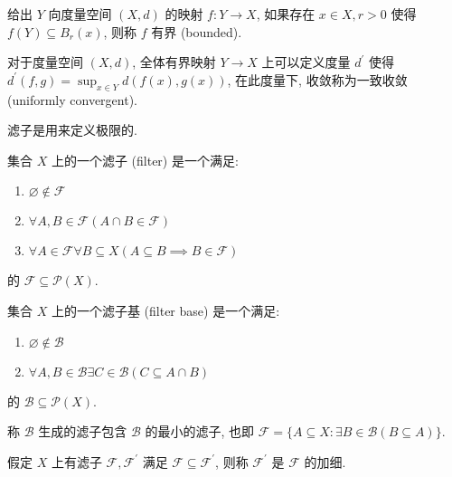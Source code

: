\begin{definition}[有界]
    给出 \(Y\) 向度量空间 \((X,d)\) 的映射 \(f : Y \to X\), 如果存在 \(x \in X,r > 0\) 使得 \(f(Y) \subseteq B_r (x)\), 则称 \(f\) 有界 (bounded).
\end{definition}

\begin{definition}
    对于度量空间 \((X,d)\), 全体有界映射 \(Y \to X\) 上可以定义度量 \(d^\prime\) 使得 \(d^\prime (f,g) = \sup_{x \in Y} d(f(x),g(x))\),
    在此度量下, 收敛称为一致收敛 (uniformly convergent).
\end{definition}

滤子是用来定义极限的.

\begin{definition}[滤子]
    集合 \(X\) 上的一个滤子 (filter) 是一个满足:

    \begin{enumerate}
        \item \(\varnothing \notin \mathcal{F}\)
        \item \(\forall A,B \in \mathcal{F} (A \cap B \in \mathcal{F})\)
        \item \(\forall A \in \mathcal{F} \forall B \subseteq X (A \subseteq B \implies B \in \mathcal{F})\)
    \end{enumerate}

    的 \(\mathcal{F} \subseteq \mathcal{P} (X)\).
\end{definition}

\begin{definition}[滤子基]
    集合 \(X\) 上的一个滤子基 (filter base) 是一个满足:

    \begin{enumerate}
        \item \(\varnothing \notin \mathcal{B}\)
        \item \(\forall A,B \in \mathcal{B} \exists C \in \mathcal{B} (C \subseteq A \cap B)\)
    \end{enumerate}

    的 \(\mathcal{B} \subseteq \mathcal{P} (X)\).

    称 \(\mathcal{B}\) 生成的滤子包含 \(\mathcal{B}\) 的最小的滤子, 也即 \(\mathcal{F} = \{A \subseteq X : \exists B \in \mathcal{B} (B \subseteq A)\}\).
\end{definition}

\begin{definition}[加细]
    假定 \(X\) 上有滤子 \(\mathcal{F},\mathcal{F}^\prime\) 满足 \(\mathcal{F} \subseteq \mathcal{F}^\prime\), 则称 \(\mathcal{F}^\prime\) 是 \(\mathcal{F}\) 的加细. 
\end{definition}

